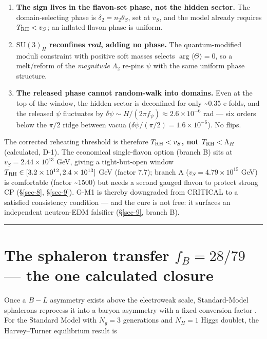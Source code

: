 \documentclass[aps,prd,preprint,nofootinbib,superscriptaddress]{revtex4-2}
\providecommand{\tightlist}{\setlength{\itemsep}{0pt}\setlength{\parskip}{0pt}}
\begin{document}
\begin{enumerate}
\def\labelenumi{\arabic{enumi}.}
\tightlist
\item
  \textbf{The sign lives in the flavon-set phase, not the hidden
  sector.} The domain-selecting phase is \(\delta_2 = n_2\theta_S\), set
  at \(v_S\), and the model already requires \(T_{\rm RH} < v_S\); an
  inflated flavon phase is uniform.
\item
  \textbf{\(\mathrm{SU}(3)_H\) reconfines \emph{real}, adding no phase.}
  The quantum-modified moduli constraint with positive soft masses
  selects \(\arg\langle\Theta\rangle = 0\), so a melt/reform of the
  \emph{magnitude} \(\Lambda_2\) re-pins \(\psi\) with the same uniform
  phase structure.
\item
  \textbf{The released phase cannot random-walk into domains.} Even at
  the top of the window, the hidden sector is deconfined for only
  \textasciitilde0.35 e-folds, and the released \(\psi\) fluctuates by
  \(\delta\psi \sim H/(2\pi f_\psi) \approx 2.6\times10^{-6}\) rad ---
  six orders below the \(\pi/2\) ridge between vacua
  (\(\delta\psi/(\pi/2) = 1.6\times10^{-6}\)). No flips.
\end{enumerate}

The corrected reheating threshold is therefore
\textbf{\(T_{\rm RH} < v_S\), not \(T_{\rm RH} < \Lambda_H\)}
(calculated, D-1). The economical single-flavon option (branch B) sits
at \(v_S = 2.44\times10^{13}\) GeV, giving a tight-but-open window
\(T_{\rm RH} \in [3.2\times10^{12}, 2.4\times10^{13}]\) GeV (factor
7.7); branch A (\(v_S = 4.79\times10^{15}\) GeV) is comfortable (factor
\textasciitilde1500) but needs a second gauged flavon to protect strong
CP (§\ref{sec-8}, §\ref{sec-9}). G-M1 is thereby downgraded from
CRITICAL to a satisfied consistency condition --- and the cure is not
free: it surfaces an independent neutron-EDM falsifier (§\ref{sec-9},
branch B).

\begin{center}\rule{0.5\linewidth}{0.5pt}\end{center}

\section{\texorpdfstring{The sphaleron transfer \(f_B = 28/79\) --- the
one calculated
closure}{The sphaleron transfer  --- the one calculated closure}}\label{sec-3}

Once a \(B{-}L\) asymmetry exists above the electroweak scale,
Standard-Model sphalerons reprocess it into a baryon asymmetry with a
fixed conversion factor \citep{Khlebnikov:1988sr}. For the Standard
Model with \(N_g = 3\) generations and \(N_H = 1\) Higgs doublet, the
Harvey--Turner equilibrium result \citep{Harvey:1990qw} is
\end{document}
